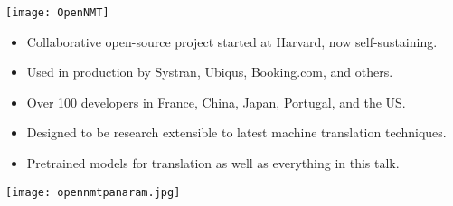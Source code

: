 \begin{frame}
  \begin{center}
    \texttt{[image: OpenNMT]}
  \end{center}

  \begin{itemize}
  \item Collaborative open-source project started at Harvard, now self-sustaining.
    \air
  \item Used in production by Systran, Ubiqus, Booking.com, and others.
    \air
  \item Over 100 developers in France, China, Japan, Portugal, and the US.
    \air
  \item Designed to be research extensible to latest machine translation techniques.
    \air

  \item Pretrained models for translation as well as everything in this talk.
  \end{itemize}
\end{frame}

\begin{frame}
  \begin{center}
    \hspace*{-9cm}\texttt{[image: opennmtpanaram.jpg]}
  \end{center}
\end{frame}
